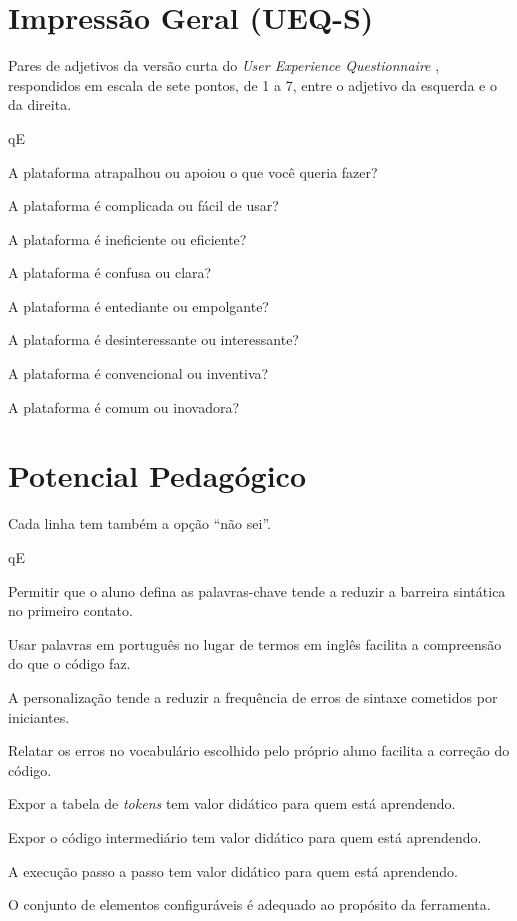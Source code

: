 \section{Impressão Geral (UEQ-S)}

Pares de adjetivos da versão curta do \textit{User Experience Questionnaire} \cite{schrepp2017}, respondidos em escala de sete pontos, de 1 a 7, entre o adjetivo da esquerda e o da direita.


\begin{questoes}{qE}
    \item\label{qE:ueq-ini} A plataforma atrapalhou ou apoiou o que você queria fazer?
    \item A plataforma é complicada ou fácil de usar?
    \item A plataforma é ineficiente ou eficiente?
    \item A plataforma é confusa ou clara?
    \item A plataforma é entediante ou empolgante?
    \item A plataforma é desinteressante ou interessante?
    \item A plataforma é convencional ou inventiva?
    \item\label{qE:ueq-fim} A plataforma é comum ou inovadora?
\end{questoes}


\section{Potencial Pedagógico}

Cada linha tem também a opção ``não sei''.


\begin{questoes}{qE}
    \item\label{qE:ped-ini} Permitir que o aluno defina as palavras-chave tende a reduzir a barreira sintática no primeiro contato.
    \item Usar palavras em português no lugar de termos em inglês facilita a compreensão do que o código faz.
    \item A personalização tende a reduzir a frequência de erros de sintaxe cometidos por iniciantes.
    \item Relatar os erros no vocabulário escolhido pelo próprio aluno facilita a correção do código.
    \item Expor a tabela de \textit{tokens} tem valor didático para quem está aprendendo.
    \item Expor o código intermediário tem valor didático para quem está aprendendo.
    \item A execução passo a passo tem valor didático para quem está aprendendo.
    \item\label{qE:ped-fim} O conjunto de elementos configuráveis é adequado ao propósito da ferramenta.
\end{questoes}


